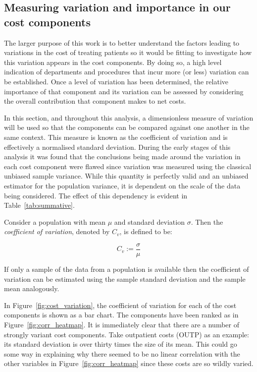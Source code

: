 \subsection{Measuring variation and importance in our cost components}

The larger purpose of this work is to better understand the factors leading to
variations in the cost of treating patients so it would be fitting to
investigate how this variation appears in the cost components. By doing so, a
high level indication of departments and procedures that incur more (or less)
variation can be established. Once a level of variation has been determined, the
relative importance of that component and its variation can be assessed by
considering the overall contribution that component makes to net costs.

In this section, and throughout this analysis, a dimensionless measure of
variation will be used so that the components can be compared against one
another in the same context. This measure is known as the coefficient of
variation and is effectively a normalised standard deviation. During the early
stages of this analysis it was found that the conclusions being made around the
variation in each cost component were flawed since variation was measured using
the classical unbiased sample variance. While this quantity is perfectly valid
and an unbiased estimator for the population variance, it is dependent on the
scale of the data being considered. The effect of this dependency is evident in
Table~\ref{tab:summative}.

\begin{definition}
    Consider a population with mean \(\mu\) and standard deviation \(\sigma\).
    Then the \emph{coefficient of variation}, denoted by \(C_v\), is defined to
    be:

    \[
        C_{v} := \frac{\sigma}{\mu}
    \]

    If only a sample of the data from a population is available then the
    coefficient of variation can be estimated using the sample standard
    deviation and the sample mean analogously.
\end{definition}

In Figure~\ref{fig:cost_variation}, the coefficient of variation for each of the
cost components is shown as a bar chart. The components have been ranked as in
Figure~\ref{fig:corr_heatmap}. It is immediately clear that there are a number
of strongly variant cost components. Take outpatient costs (OUTP) as an example:
its standard deviation is over thirty times the size of its mean. This could go
some way in explaining why there seemed to be no linear correlation with the
other variables in Figure~\ref{fig:corr_heatmap} since these costs are so wildly
varied.

